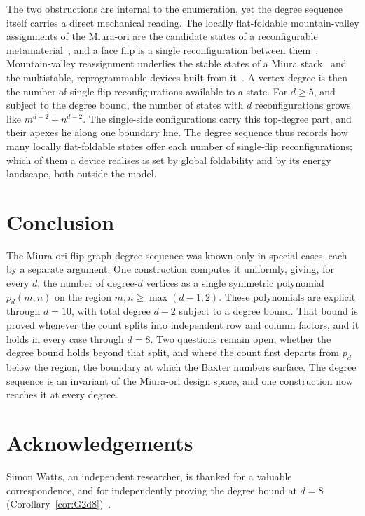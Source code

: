\documentclass[11pt]{article}
\theoremstyle{definition}
\theoremstyle{remark}
\begin{document}
The two obstructions are internal to the enumeration, yet the degree sequence
itself carries a direct mechanical reading. The locally flat-foldable
mountain-valley
assignments of the Miura-ori are the candidate states of a reconfigurable
metamaterial~\cite{Zhai2021metamaterials}, and a face flip is a single
reconfiguration between them~\cite{Pratapa2021reprogrammable}. Mountain-valley
reassignment underlies the stable states of a Miura
stack~\cite{Liu2021miura} and the multistable, reprogrammable devices built from
it~\cite{Jamalimehr2022lockable,Liu2023cellular}. A vertex degree is then the
number of single-flip reconfigurations available to a state. For $d\ge5$, and
subject to the degree bound, the number of states with
$d$ reconfigurations grows like $m^{d-2}+n^{d-2}$. The single-side configurations
carry this top-degree part, and their apexes lie along one boundary line. The degree sequence thus records how
many locally flat-foldable states offer each number of single-flip
reconfigurations; which of
them a device realises is set by global foldability and by its energy landscape,
both outside the model.

\section{Conclusion}\label{sec:conclusion}

The Miura-ori flip-graph degree sequence was known only in special cases, each
by a separate argument. One construction computes it uniformly, giving, for every $d$,
the number of degree-$d$ vertices as a single symmetric
polynomial $p_d(m,n)$ on the region $m,n\ge\max(d-1,2)$. These polynomials are
explicit through $d=10$, with total degree $d-2$ subject to a degree bound. That
bound is proved whenever the count splits into independent row and column
factors, and it holds in every case through $d=8$. Two questions remain
open, whether the degree bound holds
beyond that split, and where the count first departs from $p_d$ below the region,
the boundary at which the Baxter numbers surface. The degree sequence is an
invariant of the Miura-ori design space, and one construction now reaches it at
every degree.

\section*{Acknowledgements}
Simon Watts, an independent researcher, is thanked for a valuable correspondence,
and for independently proving the degree bound at $d=8$
(Corollary~\ref{cor:G2d8})~\cite{Watts2026}.



\end{document}
